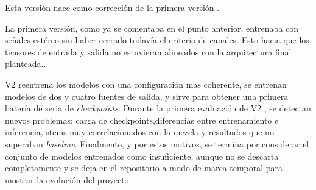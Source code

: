 Esta versión nace como corrección de la primera versión .

La primera versión, como ya se comentaba en el punto anterior, entrenaba con señales estéreo sin haber cerrado todavía el criterio de canales. Esto hacia que los tensores de entrada y salida no estuvieran alineados con la arquitectura final planteada..

V2 reentrena los modelos con una configuración mas coherente, se entrenan modelos de dos y cuatro fuentes de salida, y sirve para obtener una primera batería de seria de \textit{checkpoints}. Durante la primera evaluación de V2 , se detectan nuevos problemas: carga de checkpoints,diferencias entre entrenamiento e inferencia, stems muy correlacionados con la mezcla y resultados que no superaban \textit{baseline}. Finalmente, y por estos motivos, se termina por considerar el conjunto de modelos entrenados como insuficiente, aunque no se descarta completamente y se deja en el repositorio a modo de marca temporal para mostrar la evolución del proyecto.